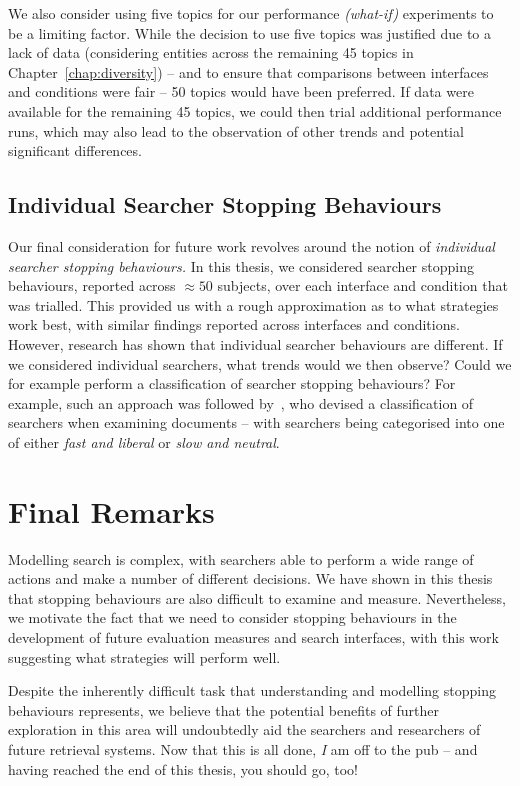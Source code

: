 We also consider using five topics for our performance \emph{(what-if)} experiments to be a limiting factor. While the decision to use five topics was justified due to a lack of data (considering entities across the remaining 45 topics in Chapter~\ref{chap:diversity}) -- and to ensure that comparisons between interfaces and conditions were fair -- 50 topics would have been preferred. If data were available for the remaining 45 topics, we could then trial additional performance runs, which may also lead to the observation of other trends and potential significant differences.

\subsection{Individual Searcher Stopping Behaviours}
Our final consideration for future work revolves around the notion of \emph{individual searcher stopping behaviours.} In this thesis, we considered searcher stopping behaviours, reported across $\approx50$ subjects, over each interface and condition that was trialled. This provided us with a rough approximation as to what strategies work best, with similar findings reported across interfaces and conditions. However, research has shown that individual searcher behaviours are different. If we considered individual searchers, what trends would we then observe? Could we for example perform a classification of searcher stopping behaviours? For example, such an approach was followed by~\cite{smucker2011user_strategies}, who devised a classification of searchers when examining documents -- with searchers being categorised into one of either \emph{fast and liberal} or \emph{slow and neutral}.

\section{Final Remarks}\label{sec:conclusions:remarks}
Modelling search is complex, with searchers able to perform a wide range of actions and make a number of different decisions. We have shown in this thesis that stopping behaviours are also difficult to examine and measure. Nevertheless, we motivate the fact that we need to consider stopping behaviours in the development of future evaluation measures and search interfaces, with this work suggesting what strategies will perform well.

Despite the inherently difficult task that understanding and modelling stopping behaviours represents, we believe that the potential benefits of further exploration in this area will undoubtedly aid the searchers and researchers of future retrieval systems. Now that this is all done, \emph{I} am off to the pub -- and having reached the end of this thesis, you should go, too!